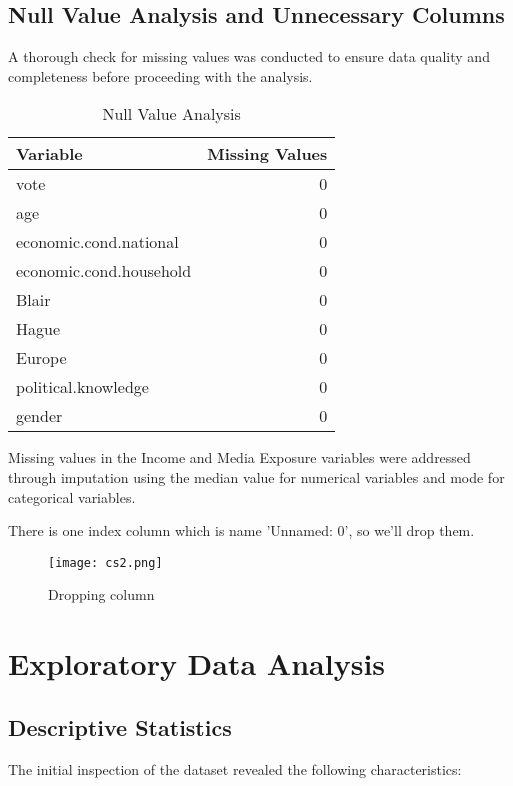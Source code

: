 \documentclass[12pt]{article}
\begin{document}
\subsection{Null Value Analysis and Unnecessary Columns}
A thorough check for missing values was conducted to ensure data quality and completeness before proceeding with the analysis.

\begin{table}[H]
\centering
\caption{Null Value Analysis}
\label{fig:null_analysis}
\begin{tabular}{lr}
\toprule
\textbf{Variable} & \textbf{Missing Values} \\
\midrule
vote                      & 0\\
age                       & 0\\
economic.cond.national    & 0\\
economic.cond.household   & 0\\
Blair                     & 0\\
Hague                     & 0\\
Europe                    & 0\\
political.knowledge       & 0\\
gender                    & 0\\
\bottomrule
\end{tabular}
\end{table}

Missing values in the Income and Media Exposure variables were addressed through imputation using the median value for numerical variables and mode for categorical variables.

There is one index column which is name 'Unnamed: 0', so we'll drop them.

\begin{figure}[h]
    \centering
    \texttt{[image: cs2.png]}
    \caption{Dropping column}
    \label{fig:example}
\end{figure}



\section{Exploratory Data Analysis}

\subsection{Descriptive Statistics}
The initial inspection of the dataset revealed the following characteristics:
\end{document}
